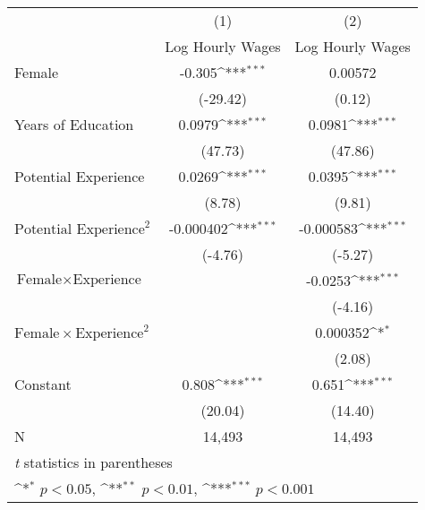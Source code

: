 {
\def\sym#1{\ifmmode^{#1}\else\(^{#1}\)\fi}
\begin{tabular}{l*{2}{c}}
\hline\hline
          &\multicolumn{1}{c}{(1)}&\multicolumn{1}{c}{(2)}\\
          &\multicolumn{1}{c}{Log Hourly Wages}&\multicolumn{1}{c}{Log Hourly Wages}\\
\hline
Female    &   -0.305\sym{***}&  0.00572         \\
          & (-29.42)         &   (0.12)         \\
Years of Education&   0.0979\sym{***}&   0.0981\sym{***}\\
          &  (47.73)         &  (47.86)         \\
Potential Experience&   0.0269\sym{***}&   0.0395\sym{***}\\
          &   (8.78)         &   (9.81)         \\
$\text{Potential Experience}^2$&-0.000402\sym{***}&-0.000583\sym{***}\\
          &  (-4.76)         &  (-5.27)         \\
$\text{Female}\times \text{Experience}$&                  &  -0.0253\sym{***}\\
          &                  &  (-4.16)         \\
$\text{Female}\times \text{Experience}^2$&                  & 0.000352\sym{*}  \\
          &                  &   (2.08)         \\
Constant  &    0.808\sym{***}&    0.651\sym{***}\\
          &  (20.04)         &  (14.40)         \\
\hline
N         &   14,493         &   14,493         \\
\hline\hline
\multicolumn{3}{l}{\footnotesize \textit{t} statistics in parentheses}\\
\multicolumn{3}{l}{\footnotesize \sym{*} \(p<0.05\), \sym{**} \(p<0.01\), \sym{***} \(p<0.001\)}\\
\end{tabular}
}
